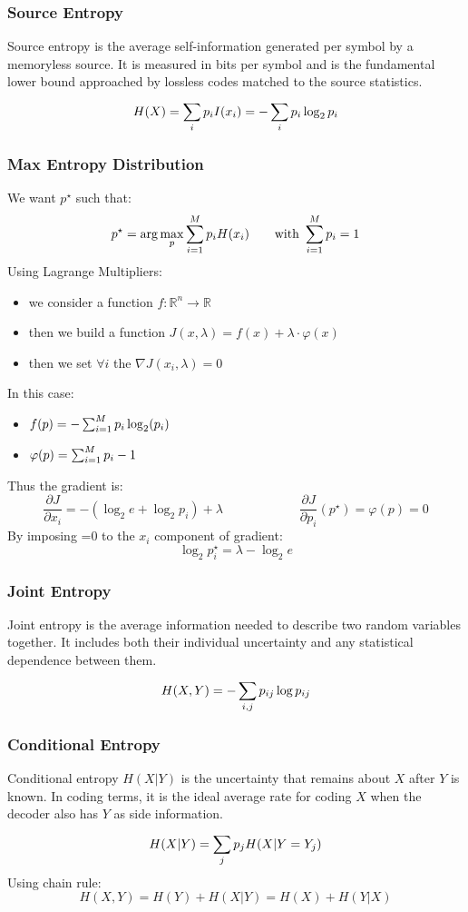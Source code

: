\subsubsection{Source Entropy}
Source entropy is the average self-information generated per symbol by a memoryless source. It is measured in bits per symbol and is the fundamental lower bound approached by lossless codes matched to the source statistics.
$$H(X) = \sr{}{i}p_iI(x_i) = -\sr{}{i}p_i\log_2 p_i$$
\subsubsection{Max Entropy Distribution}
We want $p^{\star}$ such that:
$$p^{\star} = \arg\max_{p}\sr{M}{i=1}p_iH(x_i) \qquad \text{with }\sr{M}{i=1}p_i = 1$$
Using Lagrange Multipliers:
\begin{itemize}
    \item we consider a function $f:\mathbb{R}^n \to \mathbb{R}$
    \item then we build a function $J(x, \lambda) = f(x) + \lambda\cdot \varphi(x)$ 
    \item then we set $\forall i$ the $\nabla J(x_i, \lambda) = 0$
\end{itemize}
In this case:
\begin{itemize}
    \item $f(p) = -\sr{M}{i=1}p_i\log_2(p_i)$
    \item $\varphi(p) = \sr{M}{i=1}p_i - 1$
\end{itemize}
Thus the gradient is:
$$\frac{\partial J}{\partial x_i} = -\left({\log_2 e} + \log_2 p_i\right)+\lambda \qquad \qquad \qquad \frac{\partial J}{\partial p_i}(p^\star) = \varphi(p) = 0$$
By imposing =0 to the $x_i$ component of gradient:
$$\log_2p_i^\star = \lambda - \log_2 e$$
\subsubsection{Joint Entropy}
Joint entropy is the average information needed to describe two random variables together. It includes both their individual uncertainty and any statistical dependence between them.
$$H(X,Y) = -\sr{}{i,j}p_{ij}\log p_{ij}$$
\subsubsection{Conditional Entropy}
Conditional entropy $H(X|Y)$ is the uncertainty that remains about $X$ after $Y$ is known. In coding terms, it is the ideal average rate for coding $X$ when the decoder also has $Y$ as side information.
$$H(X|Y) = \sr{}{j}p_jH(X|Y=Y_j)$$
Using chain rule:
$$H(X,Y) = H(Y) + H(X|Y) = H(X) + H(Y|X)$$
